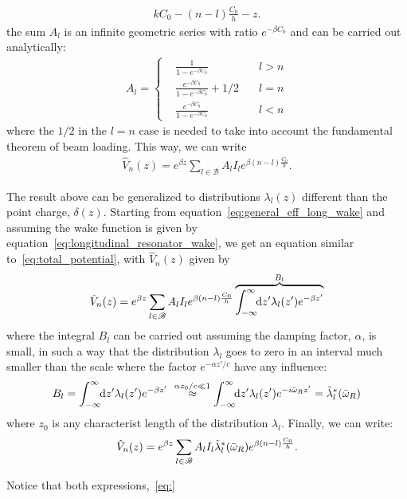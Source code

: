 \begin{apendicesenv}
\begin{align}
        kC_0 -(n-l)\frac{C_0}{h} - z.
    \end{align}
    the sum $A_l$ is an infinite geometric series with ratio $e^{-\beta C_0}$ and can be carried out analytically:
    \begin{align}
        A_l = \left\{\begin{aligned}
                        &\frac{1}{1-e^{-\beta C_0}}\quad &l>n\\
                        &\frac{e^{-\beta C_0}}{1-e^{-\beta C_0}} + 1/2 \quad &l=n\\
                        &\frac{e^{-\beta C_0}}{1-e^{-\beta C_0}}\quad &l<n
                     \end{aligned}
        \right.
    \end{align}
    where the $1/2$ in the $l=n$ case is needed to take into account the fundamental theorem of beam loading. This way, we can write
    \begin{align}\label{eq:}
        \hat{V}_n(z) = e^{\beta z}\sum_{l\in\mathscr{B}}A_l I_l e^{\beta(n-l)\frac{C_0}{h}}.
    \end{align}

    The result above can be generalized to distributions $\lambda_l(z)$ different than the point charge, $\delta(z)$. Starting from equation~\eqref{eq:general_eff_long_wake} and assuming the wake function is given by equation~\eqref{eq:longitudinal_resonator_wake}, we get an equation similar to~\eqref{eq:total_potential}, with $\hat{V}_n(z)$ given by
    \begin{align}
        \hat{V}_n(z) = e^{\beta z}\sum_{l\in\mathscr{B}}A_l I_l e^{\beta(n-l)\frac{C_0}{h}}
                    \overbrace{\int_{-\infty}^{\infty}\!\!\text{d}z' \lambda_l(z') e^{-\beta z'}}^{B_l}
    \end{align}
    where the integral $B_l$ can be carried out assuming the damping factor, $\alpha$, is small, in such a way that the distribution $\lambda_l$ goes to zero in an interval much smaller than the scale where the factor $e^{-\alpha z'/c}$ have any influence:
    \begin{align}
        B_l = \int_{-\infty}^{\infty}\!\!\text{d}z' \lambda_l(z') e^{-\beta z'}\,\, \overset{\alpha z_0/c \ll1}{\approx}
              \int_{-\infty}^{\infty}\!\!\text{d}z' \lambda_l(z') e^{-i\bar{\omega}_R z'} = \tilde{\lambda}^*_l(\bar{\omega}_R)
    \end{align}
    where $z_0$ is any characterist length of the distribution $\lambda_l$. Finally, we can write:
    \begin{align}
        \hat{V}_n(z) = e^{\beta z}\sum_{l\in\mathscr{B}}A_l I_l \tilde{\lambda}^*_l(\bar{\omega}_R) e^{\beta(n-l)\frac{C_0}{h}}.
    \end{align}

    Notice that both expressions,~\eqref{eq:}

\end{apendicesenv}


